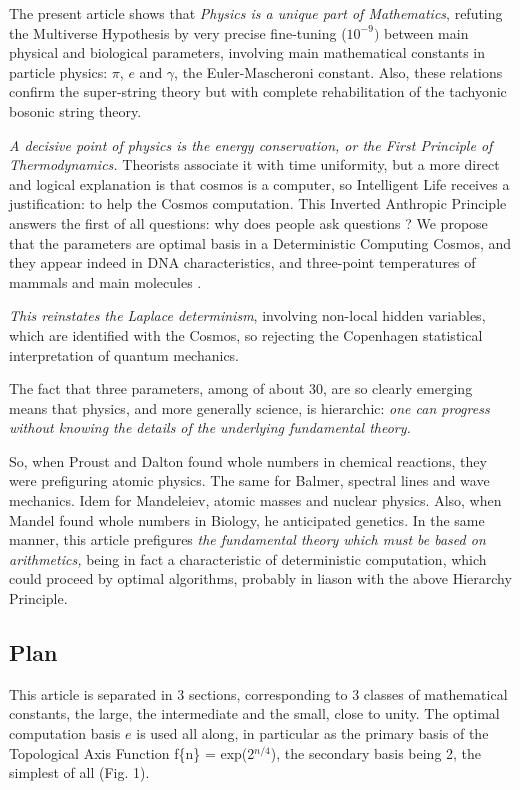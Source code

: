 \documentclass[twoside,draft]{article}
\begin{document}
\begin{sloppypar}
{The present article shows that \textit{Physics is a unique part of Mathematics}, refuting the Multiverse Hypothesis by very precise fine-tuning ($10^{-9})$ between main physical and biological parameters, involving main mathematical constants in particle physics: $\pi$, $e$ and $\gamma$, the Euler-Mascheroni constant. Also, these relations confirm the super-string theory but with complete rehabilitation of the tachyonic bosonic string theory.

\textit{A decisive point of physics is the energy conservation, or the First Principle of Thermodynamics.} Theorists associate it with time uniformity, but a more direct and logical explanation is that cosmos is a computer, so Intelligent Life receives a justification: to help the Cosmos computation. This Inverted Anthropic Principle answers the first of all questions: why does people ask questions ? We propose that the parameters are optimal basis in a Deterministic Computing Cosmos, and they appear indeed in DNA characteristics, and three-point temperatures of mammals and main molecules \cite{Sanchez1}.

\textit{This reinstates the Laplace determinism}, involving non-local hidden variables, which are identified with the Cosmos, so rejecting the Copenhagen statistical interpretation of quantum mechanics.

The fact that three parameters, among of about 30, are so clearly emerging means that physics, and more generally science, is hierarchic: \textit{one can progress without knowing the details of the underlying fundamental theory.}

So, when Proust and Dalton found whole numbers in chemical reactions, they were prefiguring atomic physics. The same for Balmer, spectral lines and wave mechanics. Idem for Mandeleiev, atomic masses and nuclear physics. Also, when Mandel found whole numbers in Biology, he anticipated genetics. In the same manner, this article prefigures \textit{the fundamental theory which must be based on arithmetics,} being in fact a characteristic of deterministic computation, which could proceed by optimal algorithms, probably in liason with the above Hierarchy Principle.

\subsection{Plan}
This article is separated in 3 sections, corresponding to 3 classes of mathematical constants, the large, the intermediate and the small, close to unity. The optimal computation basis $e$ is used all along, in particular as the primary basis of the Topological Axis Function f\{n\} = exp(2$^{n/4}$), the secondary basis being 2, the simplest of all (Fig. 1).

}
\end{sloppypar}
\end{document}
